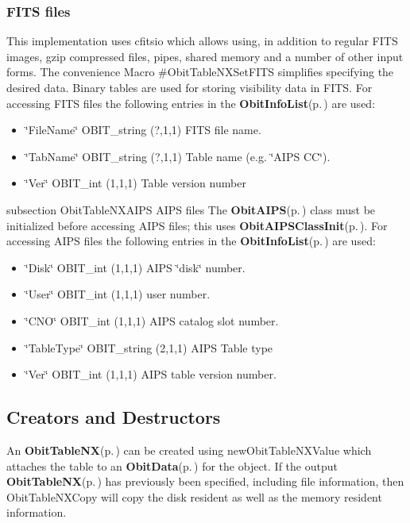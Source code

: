 \subsubsection{FITS files}\label{ObitTableWX_8h_TableFITS}
This implementation uses cfitsio which allows using, in addition to regular FITS images, gzip compressed files, pipes, shared memory and a number of other input forms. The convenience Macro \#Obit\-Table\-NXSet\-FITS simplifies specifying the desired data. Binary tables are used for storing visibility data in FITS. For accessing FITS files the following entries in the {\bf Obit\-Info\-List}{\rm (p.\,\pageref{structObitInfoList})} are used: \begin{itemize}
\item \char`\"{}File\-Name\char`\"{} OBIT\_\-string (?,1,1) FITS file name. \item \char`\"{}Tab\-Name\char`\"{} OBIT\_\-string (?,1,1) Table name (e.g. \char`\"{}AIPS CC\char`\"{}). \item \char`\"{}Ver\char`\"{} OBIT\_\-int (1,1,1) Table version number\end{itemize}
subsection Obit\-Table\-NXAIPS AIPS files The {\bf Obit\-AIPS}{\rm (p.\,\pageref{structObitAIPS})} class must be initialized before accessing AIPS files; this uses {\bf Obit\-AIPSClass\-Init}{\rm (p.\,\pageref{ObitAIPS_8c_a5})}. For accessing AIPS files the following entries in the {\bf Obit\-Info\-List}{\rm (p.\,\pageref{structObitInfoList})} are used: \begin{itemize}
\item \char`\"{}Disk\char`\"{} OBIT\_\-int (1,1,1) AIPS \char`\"{}disk\char`\"{} number. \item \char`\"{}User\char`\"{} OBIT\_\-int (1,1,1) user number. \item \char`\"{}CNO\char`\"{} OBIT\_\-int (1,1,1) AIPS catalog slot number. \item \char`\"{}Table\-Type\char`\"{} OBIT\_\-string (2,1,1) AIPS Table type \item \char`\"{}Ver\char`\"{} OBIT\_\-int (1,1,1) AIPS table version number.\end{itemize}
\subsection{Creators and Destructors}\label{ObitTableNX_8h_ObitTableNXaccess}
An {\bf Obit\-Table\-NX}{\rm (p.\,\pageref{structObitTableNX})} can be created using new\-Obit\-Table\-NXValue which attaches the table to an {\bf Obit\-Data}{\rm (p.\,\pageref{structObitData})} for the object. If the output {\bf Obit\-Table\-NX}{\rm (p.\,\pageref{structObitTableNX})} has previously been specified, including file information, then Obit\-Table\-NXCopy will copy the disk resident as well as the memory resident information.

